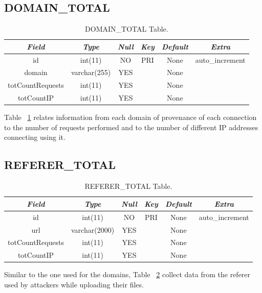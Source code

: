 \subsection{DOMAIN\_TOTAL}
\begin{table}[H]
\begin{center}
\begin{tabular}{|c|c|c|c|c|c|}
\hline
 \textit{Field} & \textit{Type} & \textit{Null} & \textit{Key} &
 \textit{Default} & \textit{Extra} \\
\hline
id & int(11) & NO & PRI & None & auto\_increment \\
domain & varchar(255) & YES &  & None &  \\
totCountRequests & int(11) & YES &  & None &  \\
totCountIP & int(11) & YES &  & None &  \\
\hline
\end{tabular}
\caption{DOMAIN\_TOTAL Table.\label{tab:DOMAIN_TOTALCategories}}
\end{center}
\end{table}

Table ~\ref{tab:DOMAIN_TOTALCategories} relates information from each domain of provenance of each connection to the number of requests performed and to the number of different IP addresses connecting using it.

\subsection{REFERER\_TOTAL}
\begin{table}[H]
\begin{center}
\begin{tabular}{|c|c|c|c|c|c|}
\hline
 \textit{Field} & \textit{Type} & \textit{Null} & \textit{Key} &
 \textit{Default} & \textit{Extra} \\
\hline
id & int(11) & NO & PRI & None & auto\_increment \\
url & varchar(2000) & YES &  & None &  \\
totCountRequests & int(11) & YES &  & None &  \\
totCountIP & int(11) & YES &  & None &  \\
\hline
\end{tabular}
\caption{REFERER\_TOTAL Table.\label{tab:REFERER_TOTALCategories}}
\end{center}
\end{table}

Similar to the one used for the domains, Table ~\ref{tab:REFERER_TOTALCategories} collect data from the referer used by attackers while uploading their files.

